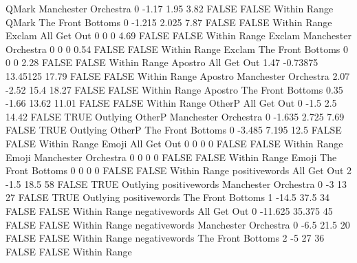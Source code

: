 QMark Manchester Orchestra 0 -1.17 1.95 3.82 FALSE FALSE Within Range
QMark The Front Bottoms 0 -1.215 2.025 7.87 FALSE FALSE Within Range
Exclam All Get Out 0 0 0 4.69 FALSE FALSE Within Range
Exclam Manchester Orchestra 0 0 0 0.54 FALSE FALSE Within Range
Exclam The Front Bottoms 0 0 0 2.28 FALSE FALSE Within Range
Apostro All Get Out 1.47 -0.73875 13.45125 17.79 FALSE FALSE Within Range
Apostro Manchester Orchestra 2.07 -2.52 15.4 18.27 FALSE FALSE Within Range
Apostro The Front Bottoms 0.35 -1.66 13.62 11.01 FALSE FALSE Within Range
OtherP All Get Out 0 -1.5 2.5 14.42 FALSE TRUE Outlying
OtherP Manchester Orchestra 0 -1.635 2.725 7.69 FALSE TRUE Outlying
OtherP The Front Bottoms 0 -3.485 7.195 12.5 FALSE FALSE Within Range
Emoji All Get Out 0 0 0 0 FALSE FALSE Within Range
Emoji Manchester Orchestra 0 0 0 0 FALSE FALSE Within Range
Emoji The Front Bottoms 0 0 0 0 FALSE FALSE Within Range
positivewords All Get Out 2 -1.5 18.5 58 FALSE TRUE Outlying
positivewords Manchester Orchestra 0 -3 13 27 FALSE TRUE Outlying
positivewords The Front Bottoms 1 -14.5 37.5 34 FALSE FALSE Within Range
negativewords All Get Out 0 -11.625 35.375 45 FALSE FALSE Within Range
negativewords Manchester Orchestra 0 -6.5 21.5 20 FALSE FALSE Within Range
negativewords The Front Bottoms 2 -5 27 36 FALSE FALSE Within Range
